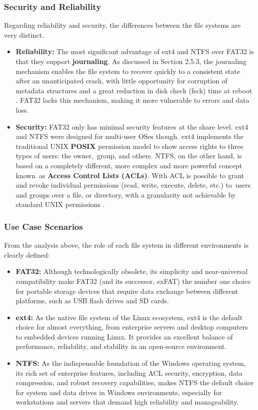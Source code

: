 \documentclass[12pt]{article}
\begin{document}
\subsubsection{Security and Reliability}
Regarding reliability and security, the differences between the file systems are very distinct.
\begin{itemize}
    \item \textbf{Reliability:} The most significant advantage of ext4 and NTFS over FAT32 is that they support \textbf{journaling}. As discussed in Section 2.5.3, the journaling mechanism enables the file system to recover quickly to a consistent state after an unanticipated crash, with little opportunity for corruption of metadata structures and a great reduction in disk check (fsck) time at reboot \parencite{Prabhakaran2005journaling}. FAT32 lacks this mechanism, making it more vulnerable to errors and data loss.
    \item \textbf{Security:} FAT32 only has minimal security features at the share level. ext4 and NTFS were designed for multi-user OSes though. ext4 implements the traditional UNIX \textbf{POSIX} permission model to show access rights to three types of users: the owner, group, and others. NTFS, on the other hand, is based on a completely different, more complex and more powerful concept known as \textbf{Access Control Lists (ACLs)}. With ACL is possible to grant and revoke individual permissions (read, write, execute, delete, etc.) to users and groups over a file, or directory, with a granularity not achievable by standard UNIX permissions \parencite{Bundele2018}.
\end{itemize}


\subsubsection{Use Case Scenarios}
From the analysis above, the role of each file system in different environments is clearly defined:
\begin{itemize}
    \item \textbf{FAT32:} Although technologically obsolete, its simplicity and near-universal compatibility make FAT32 (and its successor, exFAT) the number one choice for portable storage devices that require data exchange between different platforms, such as USB flash drives and SD cards.

    \item \textbf{ext4:} As the native file system of the Linux ecosystem, ext4 is the default choice for almost everything, from enterprise servers and desktop computers to embedded devices running Linux. It provides an excellent balance of performance, reliability, and stability in an open-source environment.

    \item \textbf{NTFS:} As the indispensable foundation of the Windows operating system, its rich set of enterprise features, including ACL security, encryption, data compression, and robust recovery capabilities, makes NTFS the default choice for system and data drives in Windows environments, especially for workstations and servers that demand high reliability and manageability.
\end{itemize}
\end{document}
